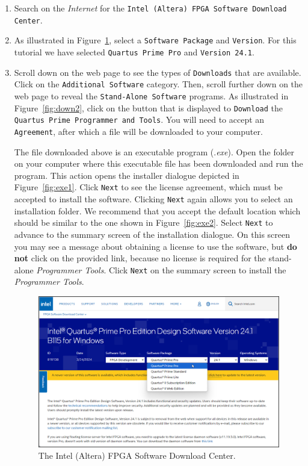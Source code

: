 \documentclass[11pt, twoside, pdftex]{article}
\begin{document}
\begin{enumerate}
\item Search on the {\it Internet} for the \texttt{Intel (Altera) FPGA Software Download Center}. 
\item As illustrated in Figure~\ref{fig:down1}, select a \texttt{Software Package} and 
\texttt{Version}. For this tutorial we have selected \texttt{Quartus Prime Pro} and
\texttt{Version 24.1}.
\item Scroll down on the web page to see the types of \texttt{Downloads} that are
available. Click on the \texttt{Additional Software} category. Then, scroll further down 
on the web page to reveal the \texttt{Stand-Alone Software} programs. As illustrated in
Figure~\ref{fig:down2}, click on the button that is displayed to \texttt{Download} 
the \texttt{Quartus Prime Programmer and Tools}. You will need to accept an \texttt{Agreement},
after which a file will be downloaded to your computer.

The file downloaded above is an executable program (.{\it exe}).
Open the folder on your computer where this executable file has 
been downloaded and run the program. This action opens the installer dialogue depicted in 
Figure~\ref{fig:exe1}. Click \texttt{Next} to see the license agreement, which
must be accepted to install the software. Clicking \texttt{Next} again allows you to
select an installation folder. We recommend that you accept the default location which
should be similar to the one shown in Figure~\ref{fig:exe2}. Select \texttt{Next} to advance 
to the summary screen of the installation dialogue. On this screen you may see a message about 
obtaining a license to use the software, but {\bf do not} click on the provided link, because 
no license is required for the stand-alone {\it Programmer Tools}. Click \texttt{Next} on the
summary screen to install the {\it Programmer Tools}.

\begin{figure}[H]
    \begin{center}
        \includegraphics[width=.9\linewidth]{figures/down1.png}
        \caption{The Intel (Altera) FPGA Software Download Center.}
        \label{fig:down1}
    \end{center}
\end{figure}


\end{enumerate}
\end{document}
